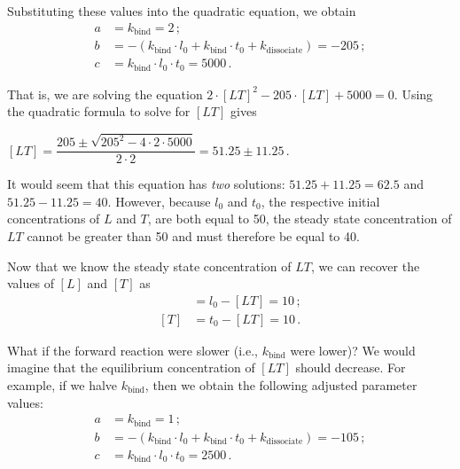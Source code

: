 
\noindent Substituting these values into the quadratic equation, we obtain
\begin{align*}
a & = k_\text{bind} = 2\,;\\
b & = - (k_\text{bind} \cdot l_0 + k_\text{bind} \cdot t_0 + k_\text{dissociate}) = -205\,;\\
c & = k_\text{bind} \cdot l_0 \cdot t_0 = 5000\,.
\end{align*}

\noindent That is, we are solving the equation $2 \cdot [LT]^2 - 205 \cdot [LT] + 5000 = 0$. Using the quadratic formula to solve for $[LT]$ gives

\begin{center}
$[LT] = \dfrac{205 \pm \sqrt{205^2 - 4 \cdot 2 \cdot 5000}}{2 \cdot 2} = 51.25 \pm 11.25$\,.
\end{center}

It would seem that this equation has \textit{two} solutions: $51.25 + 11.25 = 62.5$ and $51.25 - 11.25 = 40$. However, because $l_0$ and $t_0$, the respective initial concentrations of $L$ and $T$, are both equal to 50, the steady state concentration of $LT$ cannot be greater than 50 and must therefore be equal to 40.

Now that we know the steady state concentration of $LT$, we can recover the values of $[L]$ and $[T]$ as
\begin{align*}
[L] & = l_0 - [LT] = 10\,;\\
[T] & = t_0 - [LT] = 10\,.
\end{align*}

What if the forward reaction were slower (i.e., $k_\text{bind}$ were lower)? We would imagine that the equilibrium concentration of $[LT]$ should decrease. For example, if we halve $k_\text{bind}$, then we obtain the following adjusted parameter values:
\begin{align*}
a & = k_\text{bind} = 1\,;\\
b & = - (k_\text{bind} \cdot l_0 + k_\text{bind} \cdot t_0 + k_\text{dissociate}) = -105\,;\\
c & = k_\text{bind} \cdot l_0 \cdot t_0 = 2500\,.
\end{align*}


